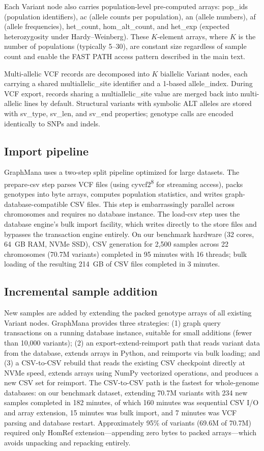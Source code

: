 \documentclass[11pt,a4paper]{article}
\newcommand{\citenum}[1]{\textsuperscript{#1}}
\begin{document}
Each Variant node also carries population-level pre-computed arrays: pop\_ids (population identifiers), ac (allele counts per population), an (allele numbers), af (allele frequencies), het\_count, hom\_alt\_count, and het\_exp (expected heterozygosity under Hardy--Weinberg). These $K$-element arrays, where $K$ is the number of populations (typically 5--30), are constant size regardless of sample count and enable the FAST PATH access pattern described in the main text.

Multi-allelic VCF records are decomposed into $K$ biallelic Variant nodes, each carrying a shared multiallelic\_site identifier and a 1-based allele\_index. During VCF export, records sharing a multiallelic\_site value are merged back into multi-allelic lines by default. Structural variants with symbolic ALT alleles are stored with sv\_type, sv\_len, and sv\_end properties; genotype calls are encoded identically to SNPs and indels.

\subsection*{Import pipeline}

GraphMana uses a two-step split pipeline optimized for large datasets. The prepare-csv step parses VCF files (using cyvcf2\citenum{8} for streaming access), packs genotypes into byte arrays, computes population statistics, and writes graph-database-compatible CSV files. This step is embarrassingly parallel across chromosomes and requires no database instance. The load-csv step uses the database engine's bulk import facility, which writes directly to the store files and bypasses the transaction engine entirely. On our benchmark hardware (32 cores, 64~GB RAM, NVMe SSD), CSV generation for 2,500 samples across 22 chromosomes (70.7M variants) completed in 95 minutes with 16 threads; bulk loading of the resulting 214~GB of CSV files completed in 3 minutes.

\subsection*{Incremental sample addition}

New samples are added by extending the packed genotype arrays of all existing Variant nodes. GraphMana provides three strategies: (1) graph query transactions on a running database instance, suitable for small additions (fewer than 10,000 variants); (2) an export-extend-reimport path that reads variant data from the database, extends arrays in Python, and reimports via bulk loading; and (3) a CSV-to-CSV rebuild that reads the existing CSV checkpoint directly at NVMe speed, extends arrays using NumPy vectorized operations, and produces a new CSV set for reimport. The CSV-to-CSV path is the fastest for whole-genome databases: on our benchmark dataset, extending 70.7M variants with 234 new samples completed in 182 minutes, of which 160 minutes was sequential CSV I/O and array extension, 15 minutes was bulk import, and 7 minutes was VCF parsing and database restart. Approximately 95\% of variants (69.6M of 70.7M) required only HomRef extension---appending zero bytes to packed arrays---which avoids unpacking and repacking entirely.
\end{document}
